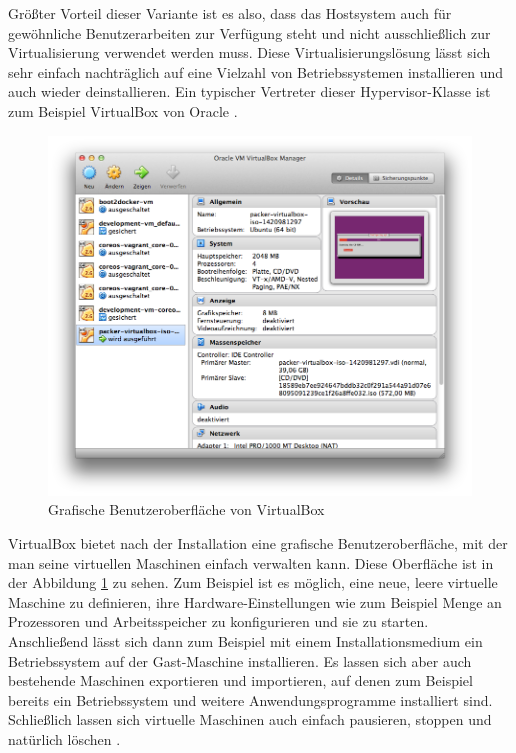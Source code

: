 Größter Vorteil dieser Variante ist es also, dass das Hostsystem auch für gewöhnliche Benutzerarbeiten zur Verfügung steht und nicht ausschließlich zur Virtualisierung verwendet werden muss. Diese Virtualisierungslösung lässt sich sehr einfach nachträglich auf eine Vielzahl von Betriebssystemen installieren und auch wieder deinstallieren. Ein typischer Vertreter dieser Hypervisor-Klasse ist zum Beispiel VirtualBox von Oracle \citep[Vgl.][S. 24]{DamMohAnd12}.

\begin{figure}[!ht]
  \begin{center}
    \includegraphics[width=14cm]{bilder/virtualbox-gui.png}
    \caption{Grafische Benutzeroberfläche von VirtualBox}
    \label{virtualbox}
  \end{center}
\end{figure}

VirtualBox bietet nach der Installation eine grafische Benutzeroberfläche, mit der man seine virtuellen Maschinen einfach verwalten kann. Diese Oberfläche ist in der Abbildung \ref{virtualbox} zu sehen. Zum Beispiel ist es möglich, eine neue, leere virtuelle Maschine zu definieren, ihre Hardware-Einstellungen wie zum Beispiel Menge an Prozessoren und Arbeitsspeicher zu konfigurieren und sie zu starten. Anschließend lässt sich dann zum Beispiel mit einem Installationsmedium ein Betriebssystem auf der Gast-Maschine installieren. Es lassen sich aber auch bestehende Maschinen exportieren und importieren, auf denen zum Beispiel bereits ein Betriebssystem und weitere Anwendungsprogramme installiert sind. Schließlich lassen sich virtuelle Maschinen auch einfach pausieren, stoppen und natürlich löschen \citep[Vgl.][S. 11 ff.]{Oracle14}.

